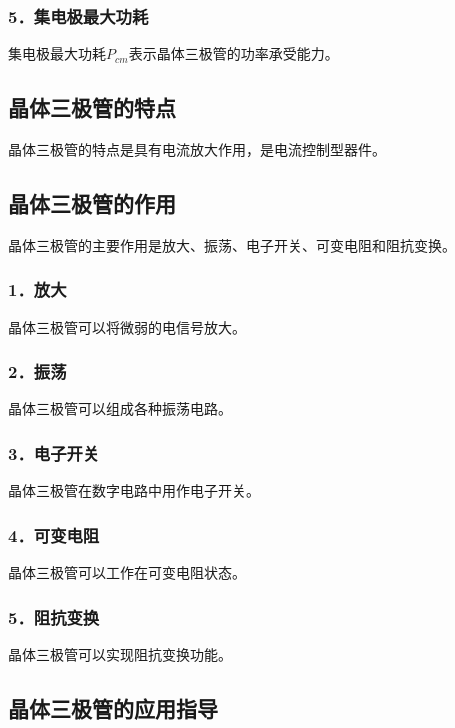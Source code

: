 \documentclass[12pt,UTF8]{ctexbook}
\begin{document}
\subsubsection{5．集电极最大功耗}

集电极最大功耗$P_{cm}$表示晶体三极管的功率承受能力。

\subsection{晶体三极管的特点}

晶体三极管的特点是具有电流放大作用，是电流控制型器件。

\subsection{晶体三极管的作用}

晶体三极管的主要作用是放大、振荡、电子开关、可变电阻和阻抗变换。

\subsubsection{1．放大}

晶体三极管可以将微弱的电信号放大。

\subsubsection{2．振荡}

晶体三极管可以组成各种振荡电路。

\subsubsection{3．电子开关}

晶体三极管在数字电路中用作电子开关。

\subsubsection{4．可变电阻}

晶体三极管可以工作在可变电阻状态。

\subsubsection{5．阻抗变换}

晶体三极管可以实现阻抗变换功能。

\subsection{晶体三极管的应用指导}
\end{document}

